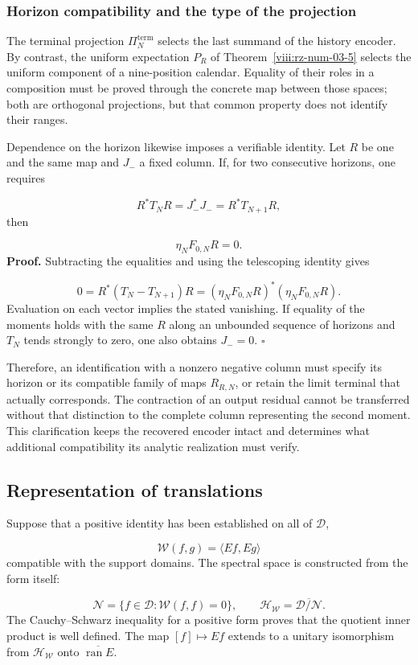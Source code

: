 \subsubsection*{Horizon compatibility and the type of the projection}
The terminal projection \(\Pi_N^{\mathrm{term}}\) selects the last summand of the history encoder. By contrast, the uniform expectation \(P_R\) of Theorem~\ref{viii:rz-num-03-5} selects the uniform component of a nine-position calendar. Equality of their roles in a composition must be proved through the concrete map between those spaces; both are orthogonal projections, but that common property does not identify their ranges.

Dependence on the horizon likewise imposes a verifiable identity. Let \(R\) be one and the same map and \(J_-\) a fixed column. If, for two consecutive horizons, one requires

\[
R^*T_NR=J_-^*J_-=R^*T_{N+1}R,
\]
then

\[
\eta_NF_{0,N}R=0.
\]
\textbf{Proof.} Subtracting the equalities and using the telescoping identity gives

\[
0=R^*(T_N-T_{N+1})R
=(\eta_NF_{0,N}R)^*(\eta_NF_{0,N}R).
\]
Evaluation on each vector implies the stated vanishing. If equality of the moments holds with the same \(R\) along an unbounded sequence of horizons and \(T_N\) tends strongly to zero, one also obtains \(J_-=0\). \hfill\(\square\)

Therefore, an identification with a nonzero negative column must specify its horizon or its compatible family of maps \(R_{R,N}\), or retain the limit terminal that actually corresponds. The contraction of an output residual cannot be transferred without that distinction to the complete column representing the second moment. This clarification keeps the recovered encoder intact and determines what additional compatibility its analytic realization must verify.

\subsection{Representation of translations}
\label{viii:rz:traslaciones}
Suppose that a positive identity has been established on all of \(\mathcal D\),

\[
\mathscr W(f,g)=\langle Ef,Eg\rangle
\]
compatible with the support domains. The spectral space is constructed from the form itself:

\[
\mathcal N=\{f\in\mathcal D:\mathscr W(f,f)=0\},\qquad
\mathcal H_{\mathscr W}
=\overline{\mathcal D/\mathcal N}.
\]
The Cauchy–Schwarz inequality for a positive form proves that the quotient inner product is well defined. The map \([f]\mapsto Ef\) extends to a unitary isomorphism from \(\mathcal H_{\mathscr W}\) onto \(\overline{\operatorname{ran}E}\).

